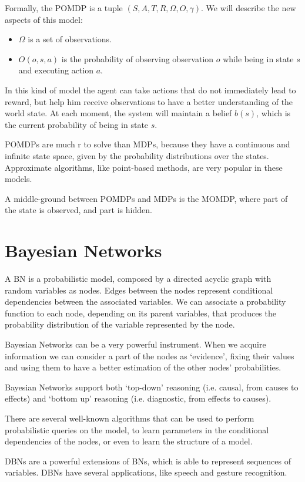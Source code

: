 Formally, the POMDP is a tuple $(S,A,T,R,\Omega,O,\gamma)$. We will describe the new aspects of this model:
\begin{itemize}
\item $\Omega$ is a set of observations.
\item $O(o,s,a)$ is the probability of observing observation $o$ while being in state $s$ and executing action $a$.
\end{itemize}

In this kind of model the agent can take actions that do not immediately lead to reward, but help him receive observations to have a better understanding of the world state. At each moment, the system will maintain a belief $b(s)$, which is the current probability of being in state $s$.

POMDPs are much r to solve than MDPs, because they have a continuous and infinite state space, given by the probability distributions over the states. Approximate algorithms, like point-based methods, are very popular in these models.

A middle-ground between POMDPs and MDPs is the MOMDP, where part of the state is observed, and part is hidden.
\section{Bayesian Networks}
\label{sec:methods-bayesian_networks}

 A BN is a probabilistic model, composed by a directed acyclic graph with random variables as nodes. Edges between the nodes represent conditional dependencies between the associated variables. We can associate a probability function to each node, depending on its parent variables, that produces the probability distribution of the variable represented by the node. 

 Bayesian Networks can be a very powerful instrument. When we acquire information we can consider a part of the nodes as `evidence', fixing their values and using them to have a better estimation of the other nodes' probabilities. 

 Bayesian Networks support both `top-down' reasoning (i.e. causal, from causes to effects) and `bottom up' reasoning (i.e. diagnostic, from effects to causes).

There are several well-known algorithms that can be used to perform probabilistic queries on the model, to learn parameters in the conditional dependencies of the nodes, or even to learn the structure of a model.

DBNs are a powerful extensions of BNs, which is able to represent sequences of variables. DBNs have several applications, like speech and gesture recognition.